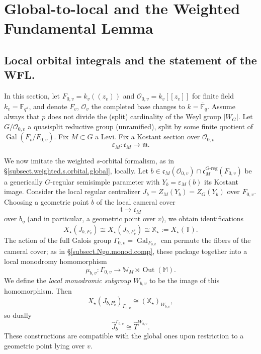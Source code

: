 \documentclass[openany]{amsbook}
\theoremstyle{definition}
\theoremstyle{remark}
\numberwithin{equation}{section}
\newcommand{\F}{\mathbb{F}}
\newcommand{\T}{\mathbb{T}}
\newcommand{\W}{\mathbb{W}}
\renewcommand{\O}{\mathcal{O}}
\newcommand{\ol}[1]{\overline{#1}}
\newcommand{\Gal}{\operatorname{Gal}}
\renewcommand{\epsilon}{\varepsilon}
\renewcommand{\-}{\operatorname{-}}
\newcommand{\Out}{\operatorname{Out}}
\newcommand{\wtilde}[1]{\widetilde{#1}}
\newcommand{\M}{\mathbb{M}}
\newcommand{\fm}{\mathfrak{m}}
\newcommand{\bX}{\mathbb{X}}
\newcommand{\ft}{\mathfrak{t}}
\newcommand{\fc}{\mathfrak{c}}
\renewcommand{\fm}{\mathfrak{m}}
\newcommand{\Greg}{G\text{-reg}}
\newcommand{\sep}{\text{s}}
\begin{document}
\chapter{Global-to-local and the Weighted Fundamental Lemma}\label{sect.local.global.WFL}

\section{Local orbital integrals and the statement of the WFL.}\label{subsect.local.setup}
In this section, let $F_{0,v} = k_v (\!(z_v)\!)$ and $\O_{0,v} = k_v [\![z_v]\!]$ for finite field $k_v = \F_{q^d}$, and denote $F_v$, $\O_v$ the completed base changes to $k = \ol{\F}_q$. Assume always that $p$ does not divide the (split) cardinality of the Weyl group $|W_G|$. Let $G/\O_{0,v}$ a quasisplit reductive group (unramified), split by some finite quotient of $\Gal(F_v/F_{0,v})$. Fix $M \subset G$ a Levi. Fix a Kostant section over $\O_{0,v}$
$$
    \epsilon_M : \fc_M \to \fm.
$$

We now imitate the weighted $s$-orbital formalism, as in \S \ref{subsect.weighted.s.orbital.global}, locally. Let $b \in \fc_M(\O_{0,v}) \cap \fc_M^{\Greg}(F_{0,v})$ be a generically $G$-regular semisimple parameter with $Y_b = \epsilon_M(b)$ its Kostant image. Consider the local regular centralizer $J_b = Z_M(Y_b) = Z_G(Y_b)$ over $F_{0,v}$. Choosing a geometric point $\wtilde{b}$ of the local cameral cover 
$$
    \ft \to \fc_M
$$
over $b_{\eta}$ (and in particular, a geometric point over $v$), we obtain identifications
$$
    X_\star(J_{b,F_{v}}) \cong X_\star(J_{b,F^{\sep}_{v}}) \cong \bX_\star := X_{\star}(\T).
$$
The action of the full Galois group $\Gamma_{0,v} = \Gal_{F_{0,v}}$ can permute the fibers of the cameral cover; as in \S \ref{subsect.Ngo.monod.comp}, these package together into a local monodromy homomorphism
$$
    \mu_{b,v} : \Gamma_{0,v} \to \W_{M} \rtimes \Out(\M).
$$
We define the \emph{local monodromic subgroup} $W_{b,v}$ to be the image of this homomorphism. Then
$$
    X_\star(J_{b,F_v^{\sep}})_{\Gamma_{0,v}} \cong (\bX_\star)_{W_{b,v}},
$$
so dually
$$
    \widehat{J}_b^{\Gamma_{0,v}} \cong \widehat{T}^{W_{b,v}}.
$$
These constructions are compatible with the global ones upon restriction to a geometric point lying over $v$.
\end{document}
